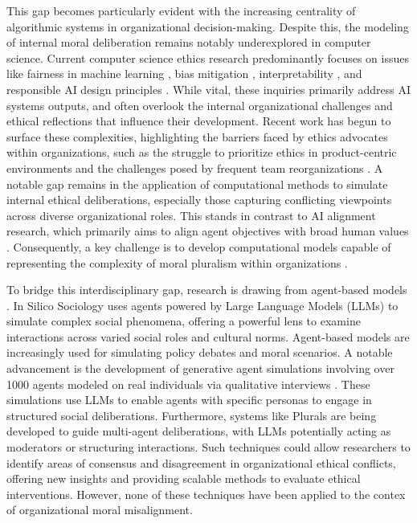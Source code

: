 This gap becomes particularly evident with the increasing centrality of algorithmic systems in organizational decision-making. Despite this, the modeling of internal moral deliberation remains notably underexplored in computer science. Current computer science ethics research predominantly focuses on issues like fairness in machine learning \cite{mehrabi2022survey}, bias mitigation \cite{bianchi2023easily}, interpretability \cite{doshi-velez2017towards}, and responsible AI design principles \cite{leslieunderstanding, sandersonimplementing,sekrstai,sadek2025challenges}. While vital, these inquiries primarily address AI systems outputs, and often overlook the internal organizational challenges and ethical reflections that influence their development. Recent work has begun to surface these complexities, highlighting the barriers faced by ethics advocates within organizations, such as the struggle to prioritize ethics in product-centric environments and the challenges posed by frequent team reorganizations \cite{Ali2023walking}. A notable gap remains in the application of computational methods to simulate internal ethical deliberations, especially those capturing conflicting viewpoints across diverse organizational roles. This stands in contrast to AI alignment research, which primarily aims to align agent objectives with broad human values \cite{gabrielartificial}. Consequently, a key challenge is to develop computational models capable of representing the complexity of moral pluralism within organizations \cite{sekrstai}.

To bridge this interdisciplinary gap, research is drawing from agent-based models \cite{gilbert_2022}. In Silico Sociology \cite{kozlowski_etal_2024} uses agents powered by Large Language Models (LLMs) to simulate complex social phenomena, offering a powerful lens to examine interactions across varied social roles and cultural norms. Agent-based models are increasingly used for simulating policy debates and moral scenarios. A notable advancement is the development of generative agent simulations involving over 1000 agents modeled on real individuals via qualitative interviews \cite{park_etal_2024_1000}. These simulations use LLMs to enable agents with specific personas to engage in structured social deliberations. Furthermore, systems like Plurals \cite{ashkinaze_etal_2025} are being developed to guide multi-agent deliberations, with LLMs potentially acting as moderators or structuring interactions. Such techniques could allow researchers to identify areas of consensus and disagreement in organizational ethical conflicts, offering new insights and providing scalable methods to evaluate ethical interventions. However, none of these techniques have been applied to the contex of organizational moral misalignment.


